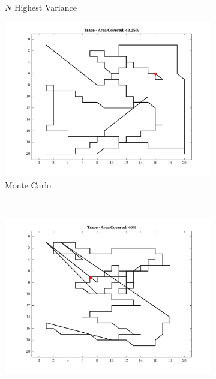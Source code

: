 \begin{figure}[htb!]
\begin{subfigure}[t]{0.3333\textwidth}
        \captionsetup{skip=0.20\baselineskip,size=footnotesize}
        \caption{$N$ Highest Variance}
    \end{subfigure}%
    \begin{subfigure}[t]{0.3333\textwidth}
        \centering
        \includegraphics[width=\linewidth]{figures/hbresults/path_mc_40p_20x20_sf_4_seed_2.png}
        \captionsetup{skip=0.20\baselineskip,size=footnotesize}
        \caption{Monte Carlo}
    \end{subfigure}%
    \\
    \begin{subfigure}[t]{0.3333\textwidth}
        \centering
        \includegraphics[width=\linewidth]{figures/hbresults/path_nbv_40p_20x20_sf_4_seed_2.png}

\end{subfigure}
\end{figure}
